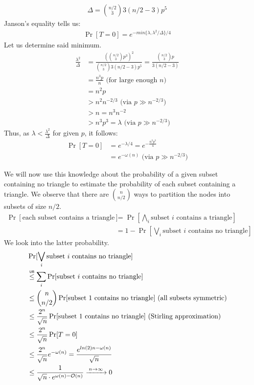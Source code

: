 \documentclass[a4paper,german]{article}
\newcommand\ub{\mathrel{\overset{\makebox[0pt]{\mbox{\normalfont\tiny\sffamily UB}}}{\leq}}}
\begin{document}
\begin{align*}
\Delta = {n/2 \choose 3}3(n/2 -3) p^5
\end{align*}
Janson's equality tells us:
\begin{align*}
\Pr[T = 0] = e^{- min\{\lambda, \lambda^2 / \Delta\} /4} 
\end{align*}
Let us determine said minimum.
\begin{align*}
\frac{\lambda^2}{\Delta} &= \frac{({n/2 \choose 3} p^3)^2}{ {n/2 \choose 3}3(n/2 -3) p^5} = \frac{{n/2 \choose 3}p}{3(n/2 -3)} \\
&= \frac{n^3p}{n} \text{     (for large enough \(n\))} \\
&= n^2p \\
&> n^2 n^{-2/3} \text{     (via } p\gg n^{-2/3} \text{)} \\
&> n = n^3 n^{-2} \\
&> n^3 p^3 = \lambda  \text{     (via } p\gg n^{-2/3} \text{)}
\end{align*}
Thus, as \( \lambda < \frac{\lambda^2}{\Delta}\) for given \(p\), it follows:
\begin{align*}
\Pr[T = 0] &= e^{-\lambda/4} = e^{-\frac{n^3p^3}{4}} \\
&= e^{-\omega(n)}    \text{     (via } p\gg n^{-2/3} \text{)}
\end{align*}

We will now use this knowledge about the probability of a given subset containing no triangle to estimate the probability of each subset containing a triangle. We observe that there are \( {n \choose n/2}\) ways to partition the nodes into subsets of size \(n/2\). 
\begin{align*}
\Pr[\text{each subset contains a triangle}] &= \Pr[ \bigwedge_i \text{subset } i \text{ contains a triangle}] \\
&= 1 - \Pr[\bigvee_i \text{subset } i \text{ contains no triangle}]
\end{align*}
We look into the latter probability.
\begin{align*}
&\Pr[\bigvee_i \text{subset } i \text{ contains no triangle}]  \\
&\ub \sum_i \Pr[\text{subset } i \text{ contains no triangle}] \\
&\leq  {n \choose n/2} \Pr[\text{subset } 1 \text{ contains no triangle}] \text{   (all subsets symmetric)} \\
&\leq \frac{2^n}{\sqrt n}  \Pr[\text{subset } 1 \text{ contains no triangle}] \text{   (Stirling approximation)} \\
&\leq \frac{2^n}{\sqrt n}  \Pr[T = 0]\\
&\leq \frac{2^n}{\sqrt n} e^{-\omega(n)} = \frac{e^{ln(2)n - \omega(n)} }{\sqrt n} \\
&\leq \frac{1}{\sqrt n \cdot e^{\omega(n) - \mathcal{O}(n)}} \xrightarrow{\: n \to \infty \: } 0
\end{align*}
\end{document}
